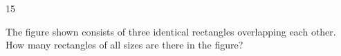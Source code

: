 \begin{probbox}{15}{\relax}
\begin{minipage}[t]{0.52\linewidth}\vspace{0pt}
The figure shown consists of three identical rectangles overlapping each other. How many rectangles of all sizes are there in the figure?
\end{minipage}\hfill
\begin{minipage}[t]{0.44\linewidth}\vspace{0pt}
\centering{}
\end{minipage}
\end{probbox}
